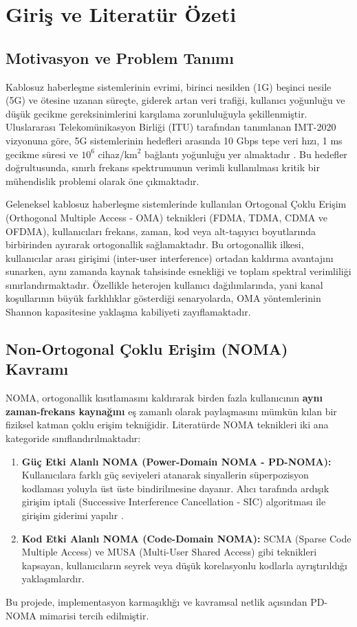\section{Giriş ve Literatür Özeti}

\subsection{Motivasyon ve Problem Tanımı}
Kablosuz haberleşme sistemlerinin evrimi, birinci nesilden (1G) beşinci nesile (5G) ve ötesine uzanan süreçte, giderek artan veri trafiği, kullanıcı yoğunluğu ve düşük gecikme gereksinimlerini karşılama zorunluluğuyla şekillenmiştir. Uluslararası Telekomünikasyon Birliği (ITU) tarafından tanımlanan IMT-2020 vizyonuna göre, 5G sistemlerinin hedefleri arasında 10 Gbps tepe veri hızı, 1 ms gecikme süresi ve $10^6$ cihaz/$\text{km}^2$ bağlantı yoğunluğu yer almaktadır \cite{itu2015imt}. Bu hedefler doğrultusunda, sınırlı frekans spektrumunun verimli kullanılması kritik bir mühendislik problemi olarak öne çıkmaktadır.

Geleneksel kablosuz haberleşme sistemlerinde kullanılan Ortogonal Çoklu Erişim (Orthogonal Multiple Access - OMA) teknikleri (FDMA, TDMA, CDMA ve OFDMA), kullanıcıları frekans, zaman, kod veya alt-taşıyıcı boyutlarında birbirinden ayırarak ortogonallik sağlamaktadır. Bu ortogonallik ilkesi, kullanıcılar arası girişimi (inter-user interference) ortadan kaldırma avantajını sunarken, aynı zamanda kaynak tahsisinde esnekliği ve toplam spektral verimliliği sınırlandırmaktadır. Özellikle heterojen kullanıcı dağılımlarında, yani kanal koşullarının büyük farklılıklar gösterdiği senaryolarda, OMA yöntemlerinin Shannon kapasitesine yaklaşma kabiliyeti zayıflamaktadır.

\subsection{Non-Ortogonal Çoklu Erişim (NOMA) Kavramı}
NOMA, ortogonallik kısıtlamasını kaldırarak birden fazla kullanıcının \textbf{aynı zaman-frekans kaynağını} eş zamanlı olarak paylaşmasını mümkün kılan bir fiziksel katman çoklu erişim tekniğidir. Literatürde NOMA teknikleri iki ana kategoride sınıflandırılmaktadır:
\begin{enumerate}
    \item \textbf{Güç Etki Alanlı NOMA (Power-Domain NOMA - PD-NOMA):} Kullanıcılara farklı güç seviyeleri atanarak sinyallerin süperpozisyon kodlaması yoluyla üst üste bindirilmesine dayanır. Alıcı tarafında ardışık girişim iptali (Successive Interference Cancellation - SIC) algoritması ile girişim giderimi yapılır \cite{ding2017application}.
    \item \textbf{Kod Etki Alanlı NOMA (Code-Domain NOMA):} SCMA (Sparse Code Multiple Access) ve MUSA (Multi-User Shared Access) gibi teknikleri kapsayan, kullanıcıların seyrek veya düşük korelasyonlu kodlarla ayrıştırıldığı yaklaşımlardır.
\end{enumerate}
Bu projede, implementasyon karmaşıklığı ve kavramsal netlik açısından PD-NOMA mimarisi tercih edilmiştir.

